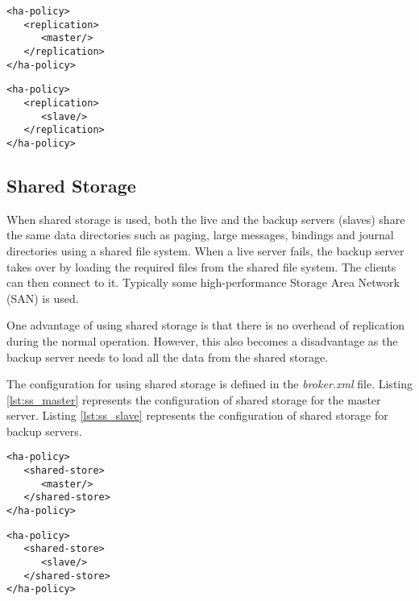 \bigskip
\noindent\begin{minipage}{.45\columnwidth}
\begin{lstlisting}[style=XmlInputStyle,caption=HA replication master, label={lst:dr_master}]
<ha-policy>
   <replication>
      <master/>
   </replication>
</ha-policy>
\end{lstlisting}
\end{minipage}\hfill
\begin{minipage}{.45\columnwidth}
\begin{lstlisting}[style=XmlInputStyle,caption=HA replication slave, label={lst:dr_slave}]
<ha-policy>
   <replication>
      <slave/>
   </replication>
</ha-policy>
\end{lstlisting}
\end{minipage}

\subsection{Shared Storage}

When shared storage is used, both the live and the backup servers (slaves) share the same data directories such as paging, large messages, bindings and journal directories using a shared file system. When a live server fails, the backup server takes over by loading the required files from the shared file system. The clients can then connect to it. Typically some high-performance Storage Area Network (SAN) is used.

One advantage of using shared storage is that there is no overhead of replication during the normal operation. However, this also becomes a disadvantage as the backup server needs to load all the data from the shared storage.

The configuration for using shared storage is defined in the \textit{broker.xml} file. Listing \ref{lst:ss_master} represents the configuration of shared storage for the master server. Listing \ref{lst:ss_slave} represents the configuration of shared storage for backup servers.

\bigskip
\noindent\begin{minipage}{.45\columnwidth}
\begin{lstlisting}[style=XmlInputStyle,caption=HA shared storage master, label={lst:ss_master}]
<ha-policy>
   <shared-store>
      <master/>
   </shared-store>
</ha-policy>
\end{lstlisting}
\end{minipage}\hfill
\begin{minipage}{.45\columnwidth}
\begin{lstlisting}[style=XmlInputStyle,caption=HA shared storage slave, label={lst:ss_slave}]
<ha-policy>
   <shared-store>
      <slave/>
   </shared-store>
</ha-policy>
\end{lstlisting}
\end{minipage}
